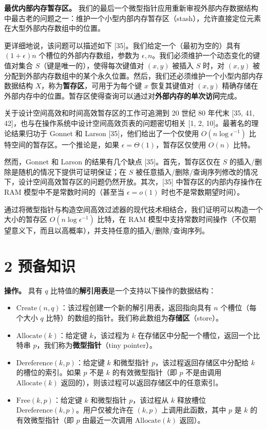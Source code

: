\documentclass[12pt,a4paper]{ctexart}
\theoremstyle{remark}
\begin{document}
\textbf{最优内部内存暂存区。} 我们的最后一个微型指针应用重新审视外部内存数据结构中最古老的问题之一：维护一个小型内部内存暂存区（stash），允许直接定位元素在大型外部内存数组中的位置。

更详细地说，该问题可以描述如下 [35]。我们给定一个（最初为空的）具有 $(1+\epsilon)n$ 个槽位的外部内存数组，参数为 $\epsilon,n$。我们必须维护一个动态变化的键值对集合 $S$（键是唯一的），使得每次键值对 $(x,y)$ 被插入 $S$ 时，对 $(x,y)$ 被分配到外部内存数组中的某个永久位置。然后，我们还必须维护一个小型内部内存数据结构 $X$，称为\textbf{暂存区}，可用于为每个键 $x$ 恢复其键值对 $(x,y)$ 精确存储在外部内存中的位置。暂存区使得查询可以通过对\textbf{外部内存的单次访问}完成。

关于设计空间高效和时间高效暂存区的工作可追溯到 20 世纪 80 年代末 [35, 41, 42]，也与在操作系统中设计空间高效页表的问题密切相关 [1, 2, 10]。最著名的理论结果归功于 Gonnet 和 Larson [35]，他们给出了一个仅使用 $O(n\log\epsilon^{-1})$ 比特空间的暂存区。一个推论是，如果 $\epsilon=\Theta(1)$，暂存区仅使用 $O(n)$ 比特。

然而，Gonnet 和 Larson 的结果有几个缺点 [35]。首先，暂存区仅在 $S$ 的插入/删除是随机的情况下提供可证明保证；在 $S$ 被任意插入/删除/查询序列修改的情况下，设计空间高效暂存区的问题仍然开放。其次，[35] 中暂存区的内部内存操作在 RAM 模型中不是常数时间的（甚至当 $\epsilon=o(1)$ 时也不是常数期望时间）。

通过将微型指针与构造空间高效过滤器的现代技术相结合，我们证明可以构造一个大小的暂存区 $O(n\log\epsilon^{-1})$ 比特，在 RAM 模型中支持常数时间操作（不仅期望意义下，而且以高概率），并支持任意的插入/删除/查询序列。

\medskip
\section{2 预备知识}
\textbf{操作。} 具有 $q$ 比特值的\textbf{解引用表}是一个支持以下操作的数据结构：

\begin{itemize}
\item $\text{Create}(n,q)$：该过程创建一个新的解引用表，返回指向具有 $n$ 个槽位（每个大小 $q$ 比特）的数组的指针。我们称此数组为\textbf{存储区}（store）。
\item $\text{Allocate}(k)$：给定键 $k$，该过程为 $k$ 在存储区中分配一个槽位，返回一个比特串 $p$，我们称为\textbf{微型指针}（tiny pointer）。
\item $\text{Dereference}(k,p)$：给定键 $k$ 和微型指针 $p$，该过程返回存储区中分配给 $k$ 的槽位的索引。如果 $p$ 不是 $k$ 的有效微型指针（即 $p$ 不是由调用 $\text{Allocate}(k)$ 返回的），则该过程可以返回存储区中的任意索引。
\item $\text{Free}(k,p)$：给定键 $k$ 和微型指针 $p$，该过程从 $k$ 释放槽位 $\text{Dereference}(k,p)$。用户仅被允许在 $(k,p)$ 上调用此函数，其中 $p$ 是 $k$ 的有效微型指针（即 $p$ 由最近一次调用 $\text{Allocate}(k)$ 返回）。
\end{itemize}
\end{document}
